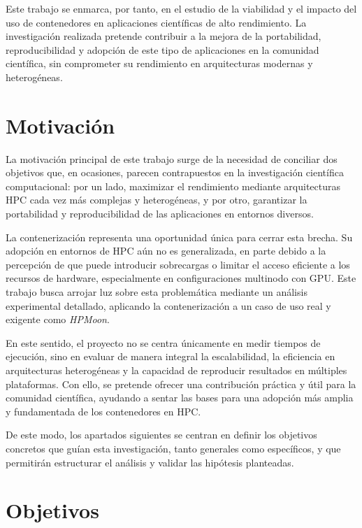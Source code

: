 Este trabajo se enmarca, por tanto, en el estudio de la viabilidad y el impacto del uso de contenedores en aplicaciones científicas de alto rendimiento. La investigación realizada pretende contribuir a la mejora de la portabilidad, reproducibilidad y adopción de este tipo de aplicaciones en la comunidad científica, sin comprometer su rendimiento en arquitecturas modernas y heterogéneas.

\section{Motivación}\label{sec:motivacion}


La motivación principal de este trabajo surge de la necesidad de conciliar dos objetivos que, en ocasiones, parecen contrapuestos en la investigación científica computacional: por un lado, maximizar el rendimiento mediante arquitecturas HPC cada vez más complejas y heterogéneas, y por otro, garantizar la portabilidad y reproducibilidad de las aplicaciones en entornos diversos.

La contenerización representa una oportunidad única para cerrar esta brecha. Su adopción en entornos de HPC aún no es generalizada, en parte debido a la percepción de que puede introducir sobrecargas o limitar el acceso eficiente a los recursos de hardware, especialmente en configuraciones multinodo con GPU. Este trabajo busca arrojar luz sobre esta problemática mediante un análisis experimental detallado, aplicando la contenerización a un caso de uso real y exigente como \textit{HPMoon}.

En este sentido, el proyecto no se centra únicamente en medir tiempos de ejecución, sino en evaluar de manera integral la escalabilidad, la eficiencia en arquitecturas heterogéneas y la capacidad de reproducir resultados en múltiples plataformas. Con ello, se pretende ofrecer una contribución práctica y útil para la comunidad científica, ayudando a sentar las bases para una adopción más amplia y fundamentada de los contenedores en HPC.

De este modo, los apartados siguientes se centran en definir los objetivos concretos que guían esta investigación, tanto generales como específicos, y que permitirán estructurar el análisis y validar las hipótesis planteadas.

\section{Objetivos}\label{sec:objetivos}

